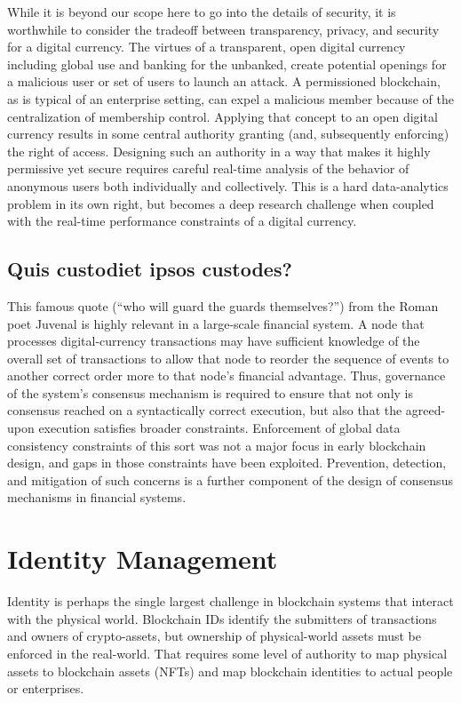 \documentclass[11pt,dvipdfm]{article}
\begin{document}
While it is beyond our scope here to go into the details of security, it is worthwhile to consider the tradeoff
between transparency, privacy, and security for a digital currency.  
The virtues of a transparent, open digital currency including global use and banking for the unbanked, create potential
openings for a malicious user or set of users to launch an attack.
A permissioned blockchain, as is typical of an enterprise setting, can expel a malicious member because
of the centralization of membership control.
Applying that concept to an open digital currency results in some central authority granting (and, subsequently
enforcing) the right of access.  
Designing such an authority in a way that makes it highly permissive yet secure requires careful real-time
analysis of the behavior of anonymous users both individually and collectively.
This is a hard data-analytics problem in its own right, but becomes a deep
research challenge when coupled with the real-time performance
constraints of a digital currency.

\subsection{Quis custodiet ipsos custodes?}
This famous quote (``who will guard the guards themselves?'') from the Roman poet Juvenal is highly relevant in a large-scale financial system.
A node that processes digital-currency transactions may have sufficient knowledge of the overall
set of transactions to allow that node to reorder the sequence of events to another correct order more to that
node's financial advantage.  
Thus,  governance of the system's consensus mechanism is required to ensure that
not only is consensus reached on a syntactically correct execution, but also that the agreed-upon
execution satisfies broader constraints.  Enforcement of global data consistency constraints of this sort was not  a major focus
in early blockchain design, and gaps in those constraints have been exploited\cite{flashboys}.  Prevention,
detection, and mitigation of such concerns is a further component of the design of
consensus mechanisms in financial systems\cite{jack}.

\section{Identity Management}
\label{hfk:identity}
Identity is perhaps the single largest challenge in blockchain systems that interact with the
physical world.
Blockchain IDs identify the submitters of transactions and owners of crypto-assets, 
but ownership of physical-world assets must be enforced in the real-world.
That requires some level of authority to map physical assets to blockchain  assets (NFTs)
and map blockchain identities to actual people or enterprises.
\end{document}
